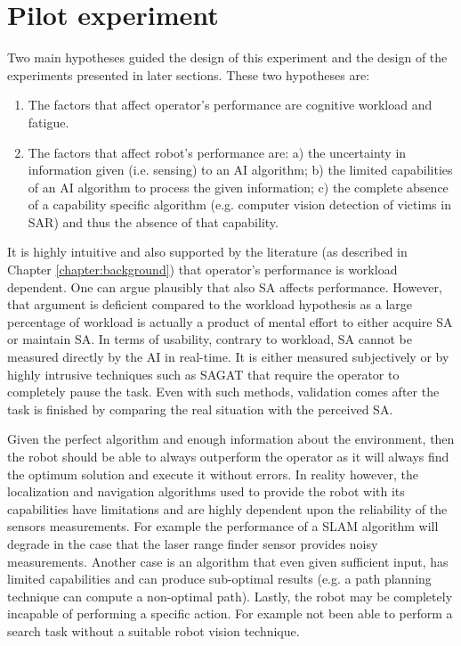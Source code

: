 \documentclass[a4paper,12pt,oneside,openright]{bhamthesis}
\begin{document}
\section{Pilot experiment}
\label{section:chapter3-pilot}
Two main hypotheses guided the design of this experiment and the design of the experiments presented in later sections. These two hypotheses are:

\begin{enumerate}
	\item The factors that affect operator's performance are cognitive workload and fatigue.
	\item The factors that affect robot's performance are: a) the uncertainty in information given (i.e. sensing) to an AI algorithm; b) the limited capabilities of an AI algorithm to process the given information; c) the complete absence of a capability specific algorithm (e.g. computer vision detection of victims in SAR) and thus the absence of that capability. 
\end{enumerate}

It is highly intuitive and also supported by the literature (as described in Chapter \ref{chapter:background}) that operator's performance is workload dependent. One can argue plausibly that also SA affects performance. However, that argument is deficient compared to the workload hypothesis as a large percentage of workload is actually a product of mental effort to either acquire SA or maintain SA. In terms of usability, contrary to workload, SA cannot be measured directly by the AI in real-time. It is either measured subjectively or by highly intrusive techniques such as SAGAT \cite{Endsley1988} that require the operator to completely pause the task. Even with such methods, validation comes after the task is finished by comparing the real situation with the perceived SA. 

Given the perfect algorithm and enough information about the environment, then the robot should be able to always outperform the operator as it will always find the optimum solution and execute it without errors. In reality however, the localization and navigation algorithms used to provide the robot with its capabilities have limitations and are highly dependent upon the reliability of the sensors measurements. For example the performance of a SLAM algorithm will degrade in the case that the laser range finder sensor provides noisy measurements. Another case is an algorithm that even given sufficient input, has limited capabilities and can produce sub-optimal results (e.g. a path planning technique can compute a non-optimal path). Lastly, the robot may be completely incapable of performing a specific action. For example not been able to perform a search task without a suitable robot vision technique.
\end{document}
